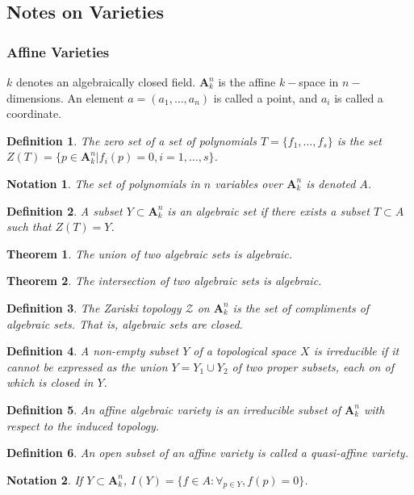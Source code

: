 \documentclass{article}
\theoremstyle{mystyle}
\newtheorem{theorem}{Theorem}[section]
\newtheorem{definition}{Definition}[section]
\newtheorem{notation}{Notation}[section]
\begin{document}
\subsection{Notes on Varieties}
\subsubsection{Affine Varieties}
$k$ denotes an algebraically closed field. $\textbf{A}_{k}^n$ is the affine $k-$space in $n-$dimensions. An element $a=(a_1,\hdots, a_n)$ is called a point, and $a_i$ is called a coordinate.
\begin{definition}
The zero set of a set of polynomials $T = \{f_1,\hdots, f_s\}$ is the set $Z(T) = \{p\in \textbf{A}_k^n|f_i(p) = 0,i=1,\hdots, s\}$.
\end{definition}
\begin{notation}
The set of polynomials in $n$ variables over $\textbf{A}_k^n$ is denoted $A$.
\end{notation}
\begin{definition}
A subset $Y\subset \textbf{A}_k^n$ is an algebraic set if there exists a subset $T\subset A$ such that $Z(T) = Y$.
\end{definition}
\begin{theorem}
The union of two algebraic sets is algebraic.
\end{theorem}
\begin{theorem}
The intersection of two algebraic sets is algebraic.
\end{theorem}
\begin{definition}
The Zariski topology $\mathcal{Z}$ on $\textbf{A}_{k}^n$ is the set of compliments of algebraic sets. That is, algebraic sets are closed.
\end{definition}
\begin{definition}
A non-empty subset $Y$ of a topological space $X$ is irreducible if it cannot be expressed as the union $Y=Y_1\cup Y_2$ of two proper subsets, each on of which is closed in $Y$.
\end{definition}
\begin{definition}
An affine algebraic variety is an irreducible subset of $\textbf{A}_k^n$ with respect to the induced topology.
\end{definition}
\begin{definition}
An open subset of an affine variety is called a quasi-affine variety.
\end{definition}
\begin{notation}
If $Y\subset \textbf{A}_k^n$, $I(Y) = \{f\in A:\forall_{p\in Y}, f(p) = 0\}$.
\end{notation}
\end{document}
